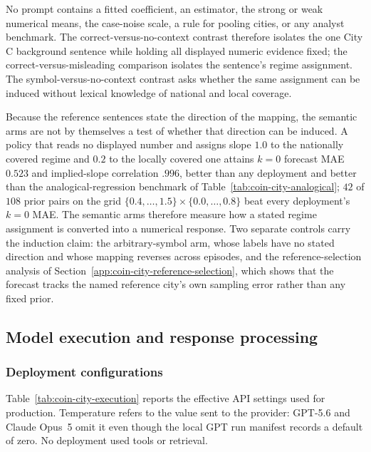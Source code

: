 No prompt contains a fitted coefficient, an estimator, the strong or weak
numerical means, the case-noise scale, a rule for pooling cities, or any analyst
benchmark. The correct-versus-no-context contrast therefore isolates the one City
C background sentence while holding all displayed numeric evidence fixed; the
correct-versus-misleading comparison isolates the sentence's regime assignment.
The symbol-versus-no-context contrast asks whether the same assignment can be
induced without lexical knowledge of national and local coverage.

Because the reference sentences state the direction of the mapping, the semantic
arms are not by themselves a test of whether that direction can be induced. A
policy that reads no displayed number and assigns slope $1.0$ to the
nationally covered regime and $0.2$ to the locally covered one attains $k=0$
forecast MAE $0.523$ and implied-slope correlation $.996$, better than any
deployment and better than the analogical-regression benchmark of
Table~\ref{tab:coin-city-analogical}; $42$ of $108$ prior pairs on the grid
$\{0.4,\dots,1.5\}\times\{0.0,\dots,0.8\}$ beat every deployment's $k=0$ MAE.
The semantic arms therefore measure how a stated regime assignment is converted
into a numerical response. Two separate controls carry the induction claim: the
arbitrary-symbol arm, whose labels have no stated direction and whose mapping
reverses across episodes, and the reference-selection analysis of
Section~\ref{app:coin-city-reference-selection}, which shows that the forecast
tracks the named reference city's own sampling error rather than any fixed prior.

\subsection{Model execution and response processing}
\label{app:coin-city-execution}

\subsubsection{Deployment configurations}
Table~\ref{tab:coin-city-execution} reports the effective API settings used for
production. Temperature refers to the value sent to the provider: GPT-5.6 and
Claude Opus~5 omit it even though the local GPT run manifest records a default of
zero. No deployment used tools or retrieval.

